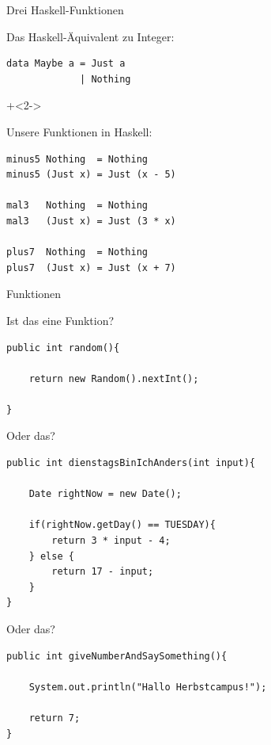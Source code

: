 \begin{frame}[fragile]{Drei Haskell-Funktionen}

Das Haskell-Äquivalent zu Integer:

\begin{lstlisting}
data Maybe a = Just a
             | Nothing
\end{lstlisting}

\onslide+<2->
~

Unsere Funktionen in Haskell:

\begin{lstlisting}
minus5 Nothing  = Nothing
minus5 (Just x) = Just (x - 5)

mal3   Nothing  = Nothing
mal3   (Just x) = Just (3 * x)

plus7  Nothing  = Nothing
plus7  (Just x) = Just (x + 7)
\end{lstlisting}
\end{frame}



\begin{frame}[fragile]{}
\begin{center}
\Huge
Funktionen
\end{center}
\end{frame}

\begin{frame}[fragile]{Ist das eine Funktion?}
\begin{lstlisting}
public int random(){

    return new Random().nextInt();
    
}
\end{lstlisting}
\end{frame}

\begin{frame}[fragile]{Oder das?}
\begin{lstlisting}
public int dienstagsBinIchAnders(int input){

    Date rightNow = new Date();

    if(rightNow.getDay() == TUESDAY){
        return 3 * input - 4;
    } else {
        return 17 - input;
    }
}
\end{lstlisting}
\end{frame}

\begin{frame}[fragile]{Oder das?}
\begin{lstlisting}
public int giveNumberAndSaySomething(){

    System.out.println("Hallo Herbstcampus!");
    
    return 7;
}
\end{lstlisting}
\end{frame}


